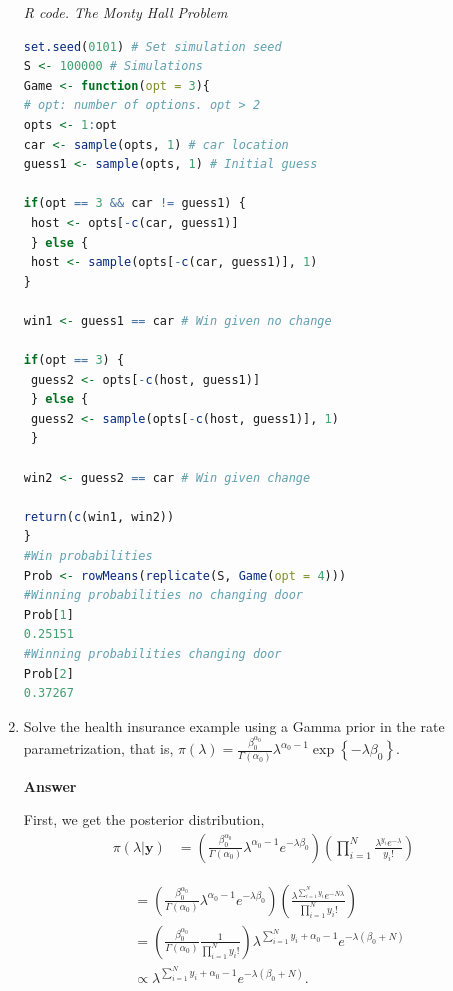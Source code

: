 \begin{enumerate}[leftmargin=*]
\begin{tcolorbox}[enhanced,width=4.67in,center upper,
	fontupper=\large\bfseries,drop shadow southwest,sharp corners]
\textit{R code. The Monty Hall Problem}
\begin{VF}
\begin{lstlisting}[basicstyle=\footnotesize, language=R]
set.seed(0101) # Set simulation seed
S <- 100000 # Simulations
Game <- function(opt = 3){
# opt: number of options. opt > 2
opts <- 1:opt 
car <- sample(opts, 1) # car location
guess1 <- sample(opts, 1) # Initial guess
		
if(opt == 3 && car != guess1) {
 host <- opts[-c(car, guess1)]
 } else {
 host <- sample(opts[-c(car, guess1)], 1)
}
			
win1 <- guess1 == car # Win given no change
			
if(opt == 3) {
 guess2 <- opts[-c(host, guess1)]
 } else {
 guess2 <- sample(opts[-c(host, guess1)], 1)
 } 
			
win2 <- guess2 == car # Win given change
			
return(c(win1, win2))
}
#Win probabilities
Prob <- rowMeans(replicate(S, Game(opt = 4))) 
#Winning probabilities no changing door
Prob[1]
0.25151
#Winning probabilities changing door
Prob[2]
0.37267
\end{lstlisting}
\end{VF}
\end{tcolorbox}

\item Solve the health insurance example using a Gamma prior in the rate parametrization, that is, $\pi(\lambda)=\frac{\beta_0^{\alpha_0}}{\Gamma(\alpha_0)}\lambda^{\alpha_0-1}\exp\left\{-\lambda\beta_0\right\}$.

\textbf{Answer}

First, we get the posterior distribution,
\begin{align}
	\pi\left(\lambda | \textbf{y}  \right) & = \left( \frac{\beta_0^{\alpha_0}}{\Gamma(\alpha_0)} \lambda^{\alpha_0 - 1} e^{-\lambda \beta_0} \right) \left(  \prod_{i = 1}^{N} \frac{\lambda^{y_i} e^{-\lambda}}{y_i!} \right)
\end{align}

\begin{align}
	& = \left( \frac{\beta_0^{\alpha_0}}{\Gamma(\alpha_0)} \lambda^{\alpha_0 - 1} e^{-\lambda \beta_0} \right) \left( \frac{\lambda^{\sum_{i = 1}^{N} y_i} e^{-N \lambda}}{\prod_{i = 1}^{N} y_i !}\right) \nonumber\\ 
	& = \left(  \frac{\beta_0^{\alpha_0}}{\Gamma(\alpha_0)} \frac{1}{\prod_{i = 1}^{N} y_i !} \right) \lambda^{\sum_{i = 1}^{N} y_i + \alpha_0 - 1} e^{-\lambda\left( \beta_0 + N \right) } \nonumber \\
	& \propto \lambda^{\sum_{i = 1}^{N} y_i + \alpha_0 - 1} e^{-\lambda\left( \beta_0 + N \right) }.\\ \nonumber 
\end{align}


\end{enumerate}
